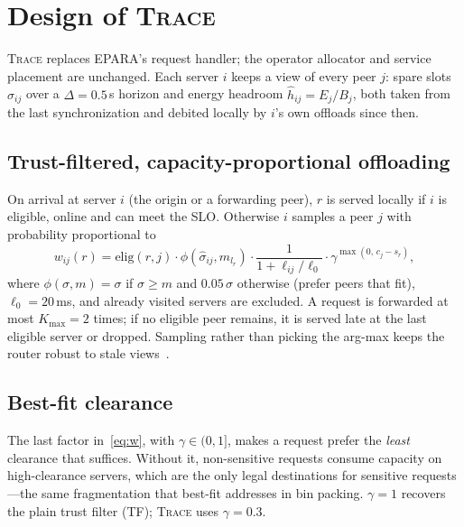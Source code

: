 \documentclass[journal]{IEEEtran}
\newcommand{\sys}{\textsc{Trace}}
\begin{document}
\section{Design of \sys}\label{sec:design}

\sys{} replaces EPARA's request handler; the operator allocator and service placement are unchanged. Each server $i$ keeps a view of every peer $j$: spare slots $\hat\sigma_{ij}$ over a $\Delta=0.5$\,s horizon and energy headroom $\hat h_{ij}=E_j/B_j$, both taken from the last synchronization and debited locally by $i$'s own offloads since then.

\subsection{Trust-filtered, capacity-proportional offloading}
On arrival at server $i$ (the origin or a forwarding peer), $r$ is served locally if $i$ is eligible, online and can meet the SLO. Otherwise $i$ samples a peer $j$ with probability proportional to
\begin{equation}
w_{ij}(r)=\mathrm{elig}(r,j)\cdot\phi(\hat\sigma_{ij},m_{l_r})\cdot\frac{1}{1+\ell_{ij}/\ell_0}\cdot\gamma^{\max(0,\,c_j-s_r)},\label{eq:w}
\end{equation}
where $\phi(\sigma,m)=\sigma$ if $\sigma\ge m$ and $0.05\,\sigma$ otherwise (prefer peers that fit), $\ell_0=20$\,ms, and already visited servers are excluded. A request is forwarded at most $K_{\max}=2$ times; if no eligible peer remains, it is served late at the last eligible server or dropped. Sampling rather than picking the arg-max keeps the router robust to stale views~\cite{mitzenmacher2000old}.

\subsection{Best-fit clearance}
The last factor in~\eqref{eq:w}, with $\gamma\in(0,1]$, makes a request prefer the \emph{least} clearance that suffices. Without it, non-sensitive requests consume capacity on high-clearance servers, which are the only legal destinations for sensitive requests---the same fragmentation that best-fit addresses in bin packing. $\gamma=1$ recovers the plain trust filter (TF); \sys{} uses $\gamma=0.3$.
\end{document}
